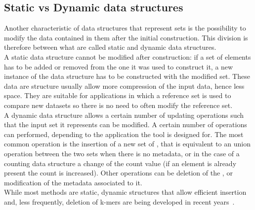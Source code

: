 \subsection{Static vs Dynamic data structures}
\label{sec:staticdynamic}
Another characteristic of data structures that represent \kmer sets is the possibility to modify the data contained in them after the initial construction. This division is therefore between what are called static and dynamic data structures. \\
A static data structure cannot be modified after construction: if a set of elements has to be added or removed from the one it was used to construct it, a new instance of the data structure has to be constructed with the modified set. These data are structure usually allow more compression of the input data, hence less space. They are suitable for applications in which a reference set is used to compare new datasets so there is no need to often modify the reference set.\\
A dynamic data structure allows a certain number of updating operations such that the input set it represents can be modified. A certain number of operations can performed, depending to the application the tool is designed for. The most common operation is the insertion of a new set of \kmers, that is equivalent to an union operation between the two sets when there is no metadata, or in the case of a counting data structure a change of the count value (if an element is already present the count is increased). Other operations can be deletion of the \kmer, or modification of the metadata associated to it. \\
While most methods are static, dynamic structures that allow efficient insertion and, less frequently, deletion of k-mers are being developed in recent years~\cite{marchet2024kmersets}.

